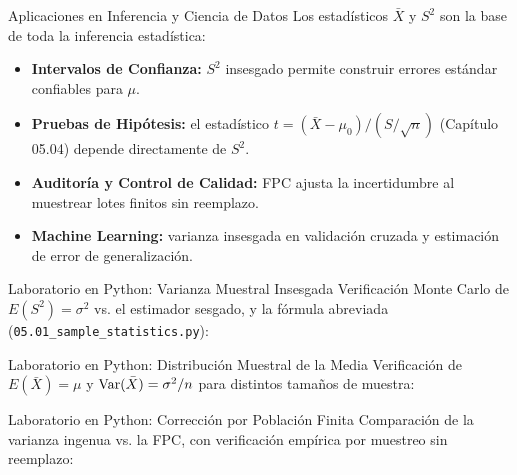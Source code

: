 \documentclass[10pt, aspectratio=169]{beamer}
\begin{document}
\begin{frame}{Aplicaciones en Inferencia y Ciencia de Datos}
  \footnotesize
  Los estadísticos $\bar{X}$ y $S^2$ son la base de toda la inferencia estadística: \pause

  \vspace{0.15cm}
  \begin{itemize}\itemsep=0.12cm
    \item \textbf{Intervalos de Confianza:} $S^2$ insesgado permite construir errores estándar confiables para $\mu$. \pause
    \item \textbf{Pruebas de Hipótesis:} el estadístico $t = (\bar{X}-\mu_0)/(S/\sqrt{n})$ (Capítulo 05.04) depende directamente de $S^2$. \pause
    \item \textbf{Auditoría y Control de Calidad:} FPC ajusta la incertidumbre al muestrear lotes finitos sin reemplazo. \pause
    \item \textbf{Machine Learning:} varianza insesgada en validación cruzada y estimación de error de generalización.
  \end{itemize}
\end{frame}

\begin{frame}[fragile]{Laboratorio en Python: Varianza Muestral Insesgada}
  \scriptsize
  Verificación Monte Carlo de $E(S^2)=\sigma^2$ vs. el estimador sesgado, y la fórmula abreviada (\texttt{05.01\_sample\_statistics.py}):
  {
  }
\end{frame}

\begin{frame}[fragile]{Laboratorio en Python: Distribución Muestral de la Media}
  \scriptsize
  Verificación de $E(\bar{X})=\mu$ y $\operatorname{Var}(\bar{X})=\sigma^2/n$ para distintos tamaños de muestra:
  {
  }
\end{frame}

\begin{frame}[fragile]{Laboratorio en Python: Corrección por Población Finita}
  \scriptsize
  Comparación de la varianza ingenua vs. la FPC, con verificación empírica por muestreo sin reemplazo:
  {
  }
\end{frame}
\end{document}
